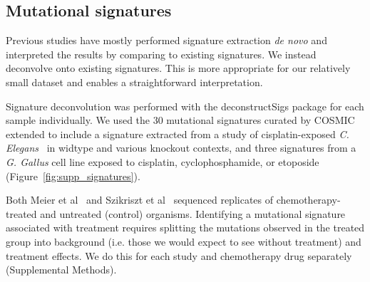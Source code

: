 \subsection*{Mutational signatures}
Previous studies have mostly performed signature extraction \textit{de novo} and interpreted the results by comparing to existing signatures. We instead deconvolve onto existing signatures. This is more appropriate for our relatively small dataset and enables a straightforward interpretation.

Signature deconvolution was performed with the deconstructSigs\cite{Rosenthal_2016} package for each sample individually. We used the 30 mutational signatures curated by COSMIC~\cite{364242} extended to include a signature extracted from a study of cisplatin-exposed \textit{C. Elegans}~\cite{Meier_2014} in widtype and various knockout contexts, and three signatures from a \textit{G. Gallus} cell line exposed to cisplatin, cyclophosphamide, or etoposide~\cite{Szikriszt_2016} (Figure~\ref{fig:supp_signatures}).

Both Meier et al~\cite{Meier_2014} and Szikriszt et al~\cite{Szikriszt_2016} sequenced replicates of chemotherapy-treated and untreated (control) organisms. Identifying a mutational signature associated with treatment requires splitting the mutations observed in the treated group into background (i.e. those we would expect to see without treatment) and treatment effects. We do this for each study and chemotherapy drug separately (Supplemental Methods).

